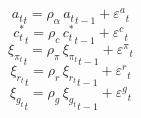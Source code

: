 \begin{dmath}
{a_{t}}_{t}={\rho_{\alpha}}\, {a_{t}}_{t-1}+{{\varepsilon^a}}_{t}
\end{dmath}
\begin{dmath}
{c_{t}^*}_{t}={\rho_{c}}\, {c_{t}^*}_{t-1}+{{\varepsilon^c}}_{t}
\end{dmath}
\begin{dmath}
{\xi_{\pi_{t}}}_{t}={\rho_{\pi}}\, {\xi_{\pi_{t}}}_{t-1}+{{\varepsilon^{\pi}}}_{t}
\end{dmath}
\begin{dmath}
{\xi_{r}_{t}}_{t}={\rho_{r}}\, {\xi_{r}_{t}}_{t-1}+{{\varepsilon^{r}}}_{t}
\end{dmath}
\begin{dmath}
{\xi_{g}_{t}}_{t}={\rho_{g}}\, {\xi_{g}_{t}}_{t-1}+{{\varepsilon^{g}}}_{t}
\end{dmath}

